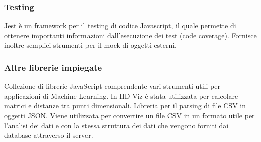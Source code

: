     \subsubsection{Testing}
        Jest è un framework per il testing di codice Javascript, il quale permette di ottenere importanti informazioni dall'esecuzione dei test (code coverage). Fornisce inoltre semplici strumenti per il mock di oggetti esterni.
    \subsubsection{Altre librerie impiegate}
        Collezione di librerie JavaScript comprendente vari strumenti utili per applicazioni di Machine Learning. In HD Viz è stata utilizzata per calcolare matrici e distanze tra punti dimensionali.
        Libreria per il parsing di file CSV in oggetti JSON. Viene utilizzata per convertire un file CSV in un formato utile per l'analisi dei dati e con la stessa struttura dei dati che vengono forniti dai database attraverso il server.